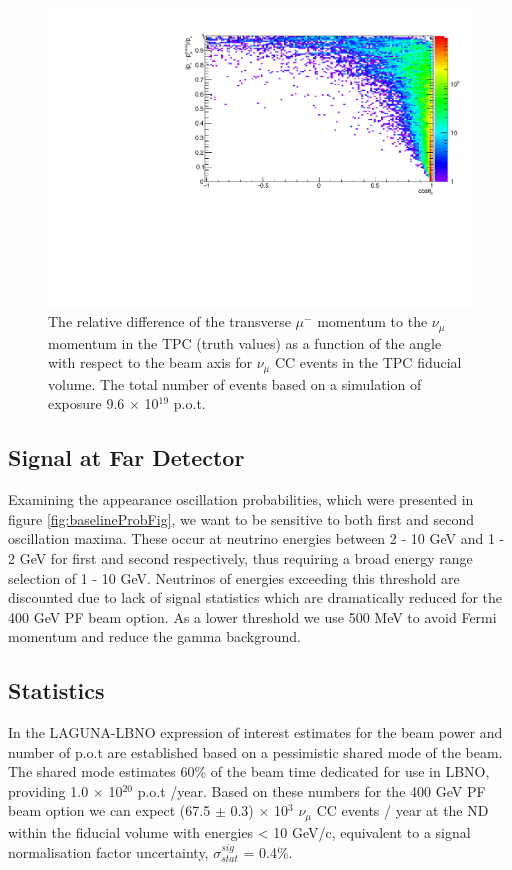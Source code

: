 \begin{figure}[htbp]
\begin{center}
  	\includegraphics[width=120mm]{Chapter4/figures/trans_muon_mom_ratio_vs_cosTheta.pdf}
	\caption{The relative difference of the transverse $\mu^{-}$ momentum to the $\nu_{\mu}$ momentum in the TPC (truth values) as a function of the angle with respect to the beam axis for $\nu_{\mu}$ CC events in the TPC fiducial volume. The total number of events based on a simulation of exposure 9.6 $\times$ 10$^{19}$ p.o.t. }
	\label{fig:muonTransMomDiffRatioVsCosTheta}
\end{center}
\end{figure}

\subsection{Signal at Far Detector}
Examining the appearance oscillation probabilities, which were presented in figure \ref{fig:baselineProbFig}, we want to be sensitive to both first and second oscillation maxima. These occur at neutrino energies between 2 - 10 GeV and 1 - 2 GeV for first and second respectively, thus requiring a broad energy range selection of 1 - 10 GeV. Neutrinos of energies exceeding this threshold are discounted due to lack of signal statistics which are dramatically reduced for the 400 GeV PF beam option. As a lower threshold we use 500 MeV to avoid Fermi momentum and reduce the gamma background.

\subsection{Statistics}
In the LAGUNA-LBNO expression of interest \cite{lbnoEoI} estimates for the beam power and number of p.o.t are established based on a pessimistic shared mode of the beam. The shared mode estimates 60\% of the beam time dedicated for use in LBNO, providing 1.0 $\times$ 10$^{20}$ p.o.t /year. Based on these numbers for the 400 GeV PF beam option we can expect (67.5 $\pm$ 0.3) $\times$ 10$^{3}$ $\nu_{\mu}$ CC events / year at the ND within the fiducial volume with energies < 10 GeV/c, equivalent to a signal normalisation factor uncertainty, $\sigma^{sig}_{stat}$ = 0.4\%. 

